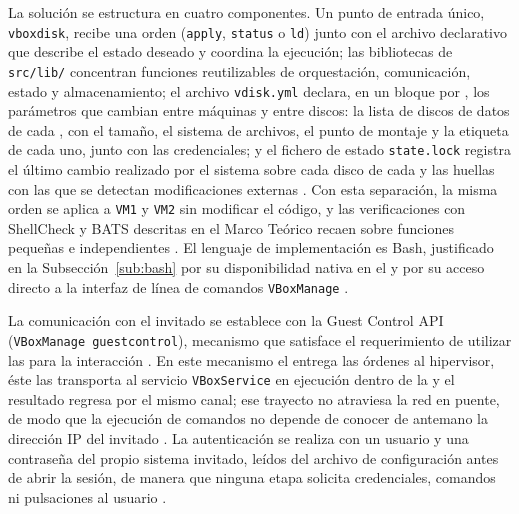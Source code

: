 La solución se estructura en cuatro componentes. Un punto de entrada único, \texttt{vboxdisk}, recibe una orden (\texttt{apply}, \texttt{status} o \texttt{ld}) junto con el archivo declarativo que describe el estado deseado y coordina la ejecución; las bibliotecas de \texttt{src/lib/} concentran funciones reutilizables de orquestación, comunicación, estado y almacenamiento; el archivo \texttt{vdisk.yml} declara, en un bloque por \vm{}, los parámetros que cambian entre máquinas y entre discos: la lista de discos de datos de cada \vm{}, con el tamaño, el sistema de archivos, el punto de montaje y la etiqueta de cada uno, junto con las credenciales; y el fichero de estado \texttt{state.lock} registra el último cambio realizado por el sistema sobre cada disco de cada \vm{} y las huellas con las que se detectan modificaciones externas \parencite{bash_best_practices}. Con esta separación, la misma orden se aplica a \texttt{VM1} y \texttt{VM2} sin modificar el código, y las verificaciones con ShellCheck y BATS descritas en el Marco Teórico recaen sobre funciones pequeñas e independientes \parencite{shellcheck, bats_testing}. El lenguaje de implementación es Bash, justificado en la Subsección~\ref{sub:bash} por su disponibilidad nativa en el \host{} y por su acceso directo a la interfaz de línea de comandos \texttt{VBoxManage} \parencite{virtualbox_vboxmanage}.

La comunicación con el invitado se establece con la Guest Control API (\texttt{VBoxManage guestcontrol}), mecanismo que satisface el requerimiento de utilizar las \guestadditions{} para la interacción \parencite{virtualbox_guestcontrol}. En este mecanismo el \host{} entrega las órdenes al hipervisor, éste las transporta al servicio \texttt{VBoxService} en ejecución dentro de la \vm{} y el resultado regresa por el mismo canal; ese trayecto no atraviesa la red en puente, de modo que la ejecución de comandos no depende de conocer de antemano la dirección IP del invitado \parencite{virtualbox_guestadditions, virtualbox_advanced_topics}. La autenticación se realiza con un usuario y una contraseña del propio sistema invitado, leídos del archivo de configuración antes de abrir la sesión, de manera que ninguna etapa solicita credenciales, comandos ni pulsaciones al usuario \parencite{virtualbox_guestcontrol}.

